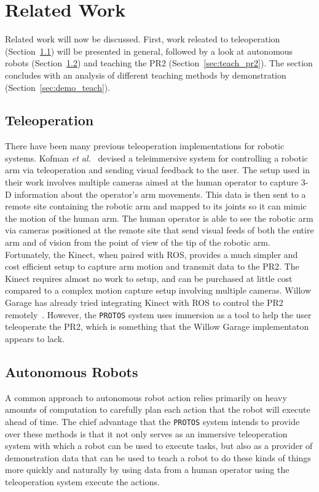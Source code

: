 \documentclass{sig-alternate}
\begin{document}
\section{Related Work}
\label{sec:related_work}
\indent  Related work will now be discussed. First, work releated to teleoperation (Section~\ref{sec:teleop}) will be presented in general, followed by a look at
autonomous robots (Section~\ref{sec:autobots}) and teaching the PR2 (Section~\ref{sec:teach_pr2}). The section concludes with an analysis of different teaching methods 
by demonstration (Section~\ref{sec:demo_teach}).

\subsection{Teleoperation}
\label{sec:teleop}
\indent There have been many previous teleoperation implementations for robotic systems. Kofman \textit{et al.}~\cite{robot_interface} devised a teleimmersive system for
controlling a robotic arm via teleoperation and sending visual feedback to the user. The setup used in their work involves multiple cameras aimed at the human operator to 
capture 3-D information about the operator's arm movements. This data is then sent to a remote site containing the robotic arm and mapped to its joints so it can mimic the 
motion of the human arm. The human operator is able to see the robotic arm via cameras positioned at the remote site that send visual feeds of both the entire arm and of 
vision from the point of view of the tip of the robotic arm. Fortunately, the Kinect, when paired with ROS, provides a much simpler and cost efficient setup to 
capture arm motion and transmit data to the PR2. The Kinect requires almost no work to setup, and can be purchased at little cost compared to a complex motion capture setup
involving multiple cameras. Willow Garage has already 
tried integrating Kinect with ROS to control the PR2 remotely~\cite{willow_kinect}. However, the {\tt PROTOS} system uses immersion as a tool to help the user teleoperate
the PR2, which is something that the Willow Garage implementaton appears to lack.

\subsection{Autonomous Robots}
\label{sec:autobots}
\indent A common approach to autonomous robot action relies primarily on heavy amounts of computation to carefully 
plan each action that the robot will execute ahead of time.  The chief 
advantage that the {\tt PROTOS} system intends to provide over these methods is that it 
not only serves as an immersive teleoperation system with which a robot can be used to
execute tasks, but also as a provider of demonstration data
that can be used to teach a robot to do these kinds
of things more quickly and naturally by using data from a human operator using the 
teleoperation system execute the actions.
\end{document}
